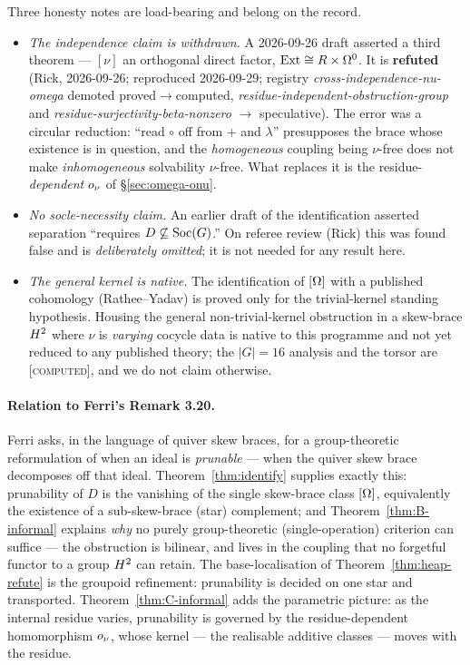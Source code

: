 Three honesty notes are load-bearing and belong on the record.
\begin{itemize}
\item \emph{The independence claim is withdrawn.} A 2026-09-26 draft asserted a
   third theorem --- $[\nu]$ an orthogonal direct factor, $\mathrm{Ext}\cong R\times\Omega^0$.
   It is \textbf{refuted} (Rick, 2026-09-26; reproduced 2026-09-29; registry
   \emph{cross-independence-nu-omega} demoted proved$\to$computed,
   \emph{residue-independent-obstruction-group} and
   \emph{residue-surjectivity-beta-nonzero} $\to$ speculative). The error was a
   circular reduction: ``read $\circ$ off from $+$ and $\lambda$'' presupposes the
   brace whose existence is in question, and the \emph{homogeneous} coupling being
   $\nu$-free does not make \emph{inhomogeneous} solvability $\nu$-free. What
   replaces it is the residue-\emph{dependent} $o_\nu$ of \S\ref{sec:omega-onu}.
\item \emph{No socle-necessity claim.} An earlier draft of the identification
   asserted separation ``requires $D\not\subseteq\mathrm{Soc}(G)$.'' On referee review
   (Rick) this was found false and is \emph{deliberately omitted}; it is not needed
   for any result here.
\item \emph{The general kernel is native.} The identification of $[\Omega]$ with a
   published cohomology (Rathee--Yadav) is proved only for the trivial-kernel
   standing hypothesis. Housing the general non-trivial-kernel obstruction in a
   skew-brace $H^2$ where $\nu$ is \emph{varying} cocycle data is native to this
   programme and not yet reduced to any published theory; the $|G|=16$ analysis and
   the torsor are \textsc{[computed]}, and we do not claim otherwise.
\end{itemize}

\paragraph{Relation to Ferri's Remark 3.20.}
Ferri \cite{ferri-qsb} asks, in the language of quiver skew braces, for a
group-theoretic reformulation of when an ideal is \emph{prunable} --- when the
quiver skew brace decomposes off that ideal. Theorem~\ref{thm:identify} supplies
exactly this: prunability of $D$ is the vanishing of the single skew-brace class
$[\Omega]$, equivalently the existence of a sub-skew-brace (star) complement; and
Theorem~\ref{thm:B-informal} explains \emph{why} no purely group-theoretic
(single-operation) criterion can suffice --- the obstruction is bilinear, and lives
in the coupling that no forgetful functor to a group $H^2$ can retain. The
base-localisation of Theorem~\ref{thm:heap-refute} is the groupoid refinement:
prunability is decided on one star and transported. Theorem~\ref{thm:C-informal}
adds the parametric picture: as the internal residue varies, prunability is
governed by the residue-dependent homomorphism $o_\nu$, whose kernel --- the
realisable additive classes --- moves with the residue.

